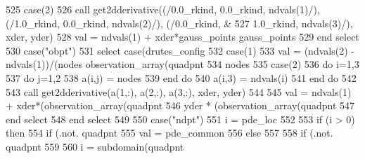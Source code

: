 \begin{DoxyCode}
525 \textcolor{comment}{                  }\textcolor{keywordflow}{case}(2)
526                     \textcolor{keyword}{call }get2dderivative((/0.0\_rkind, 0.0\_rkind, ndvals(1)/), (/1.0\_rkind\textcolor{comment}{, 0.0\_rkind, 
      ndvals(2)/), (/0.0\_rkind, &}
527 \textcolor{comment}{                                   1.0\_rkind, ndvals(3)/), xder, yder)}
528 \textcolor{comment}{                    val = ndvals(1) + xder*gauss_points%
      gauss_points%
529 \textcolor{comment}{}\textcolor{keywordflow}{                end select}
530               \textcolor{keywordflow}{case}(\textcolor{stringliteral}{"obpt"})
531                 \textcolor{keywordflow}{select case}(drutes_config%
532                   \textcolor{keywordflow}{case}(1)
533                      val = (ndvals(2) - ndvals(1))/(nodes%
      observation_array(quadpnt%
534 \textcolor{comment}{                           nodes%
535 \textcolor{comment}{                  }\textcolor{keywordflow}{case}(2)
536                     \textcolor{keywordflow}{do} i=1,3
537                       \textcolor{keywordflow}{do} j=1,2
538                         a(i,j) = nodes%
539 \textcolor{keywordflow}{                      end do}
540                       a(i,3) = ndvals(i)
541 \textcolor{keywordflow}{                    end do}
542                             
543                     \textcolor{keyword}{call }get2dderivative(a(1,:), a(2,:), a(3,:), xder, yder)
544                     
545                     val = ndvals(1) + xder*(observation_array(quadpnt%
546 \textcolor{comment}{                          yder * (observation_array(quadpnt%
547 \textcolor{comment}{}\textcolor{keywordflow}{                end select}
548 \textcolor{keywordflow}{          end select}
549                     
550         \textcolor{keywordflow}{case}(\textcolor{stringliteral}{"ndpt"})
551             i = pde\_loc%
552 
553             \textcolor{keywordflow}{if} (i > 0) \textcolor{keywordflow}{then}
554               \textcolor{keywordflow}{if} (.not. quadpnt%
555                 val = pde_common%
556               \textcolor{keywordflow}{else}
557               
558                 \textcolor{keywordflow}{if} (.not. quadpnt%
559 
560                   i = subdomain(quadpnt%
}}}
\end{DoxyCode}
